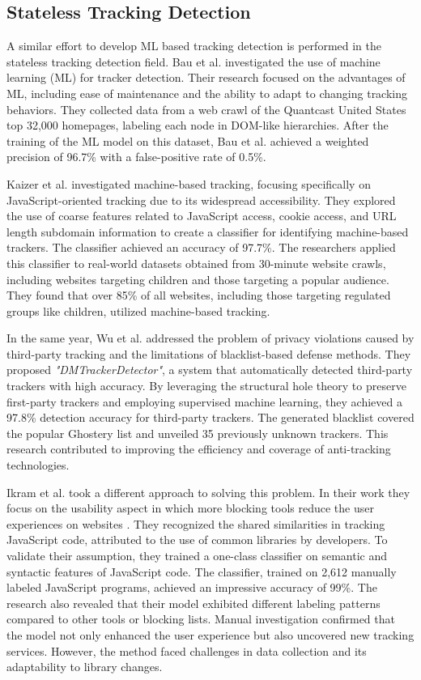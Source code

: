 \subsection{Stateless Tracking Detection}

A similar effort to develop ML based tracking detection is performed in the stateless tracking detection field. Bau et al. \cite{bau2013promising} 
investigated the use of machine learning (ML) for tracker detection. Their research focused on the advantages of ML,
including ease of maintenance and the ability to adapt to changing tracking behaviors. They collected data from a web
crawl of the Quantcast United States top 32,000 homepages, labeling each node in DOM-like hierarchies. After the training of the ML model
on this dataset, Bau et al. achieved a weighted precision of 96.7\% with a false-positive rate of 0.5\%.

Kaizer et al. \cite{kaizer2016towards} investigated machine-based tracking, focusing specifically on JavaScript-oriented tracking due to its widespread
accessibility. They explored the use of coarse features related to JavaScript access, cookie access, and URL length subdomain
information to create a classifier for identifying machine-based trackers. The classifier achieved an accuracy of 97.7\%.
The researchers applied this classifier to real-world datasets obtained from 30-minute website crawls, including websites targeting
children and those targeting a popular audience. They found that over 85\% of all websites, including those targeting regulated groups
like children, utilized machine-based tracking.

In the same year, Wu et al. \cite{wu2016machine} addressed the problem of privacy violations caused by third-party tracking and the
limitations of blacklist-based defense methods. They proposed \emph{"DMTrackerDetector"}, a system that automatically detected third-party
trackers with high accuracy. By leveraging the structural hole theory to preserve first-party trackers and employing supervised
machine learning, they achieved a 97.8\% detection accuracy for third-party trackers. The generated blacklist covered the popular
Ghostery \cite{ghostery} list and unveiled 35 previously unknown trackers. This research contributed to improving the efficiency
and coverage of anti-tracking technologies.

Ikram et al. \cite{ikram2016towards} took a different approach to solving this problem. In their work they focus on the usability aspect
in which more blocking tools reduce the user experiences on websites \cite{leon2012johnny}. They recognized the shared similarities in tracking
JavaScript code, attributed to the use of common libraries by developers. To validate their assumption, they trained a one-class
classifier on semantic and syntactic features of JavaScript code. The classifier, trained on 2,612 manually labeled JavaScript
programs, achieved an impressive accuracy of 99\%. The research also
revealed that their model exhibited different labeling patterns compared to other tools or blocking lists. Manual investigation
confirmed that the model not only enhanced the user experience but also uncovered new tracking services. However, the method
faced challenges in data collection and its adaptability to library changes.

